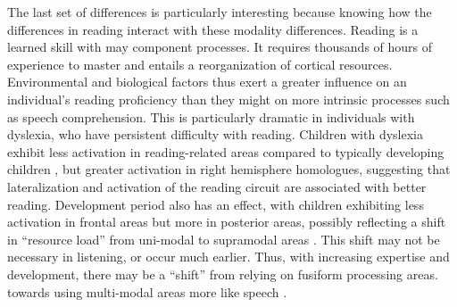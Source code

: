 The last set of differences is particularly interesting because knowing how the differences in reading interact with these modality differences. Reading is a learned skill with may component processes. It requires thousands of hours of experience to master and entails a reorganization of cortical resources. Environmental and biological factors thus exert a greater influence on an individual’s reading proficiency than they might on more intrinsic processes such as speech comprehension. This is particularly dramatic in individuals with dyslexia, who have persistent difficulty with reading. Children with dyslexia exhibit less activation in reading-related areas compared to typically developing children \citep{Pugh2000}, but greater activation in right hemisphere homologues, suggesting that lateralization and activation of the reading circuit are associated with better reading. Development period also has an effect, with children exhibiting less activation in frontal areas but more in posterior areas, possibly reflecting a shift in “resource load” from uni-modal to supramodal areas \citep{Berl2011}. This shift may not be necessary in listening, or occur much earlier. Thus, with increasing expertise and development, there may be a “shift” from relying on fusiform processing areas. towards using multi-modal areas more like speech \citep{Monzalvo2013}. 